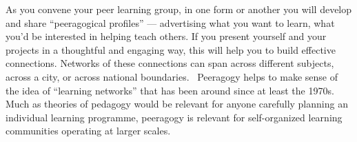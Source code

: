 As you convene your peer learning group, in one form or another you will
develop and share ``peeragogical profiles'' --- advertising what you
want to learn, what you'd be interested in helping teach others. If you
present yourself and your projects in a thoughtful and engaging way,
this will help you to build effective connections. Networks of these
connections can span across different subjects, across a city, or across
national boundaries.~ Peeragogy helps to make sense of the idea of
``learning networks'' that has been around since at least the 1970s.~
Much as theories of pedagogy would be relevant for anyone carefully
planning an individual learning programme, peeragogy is relevant for
self-organized learning communities operating at larger scales.
